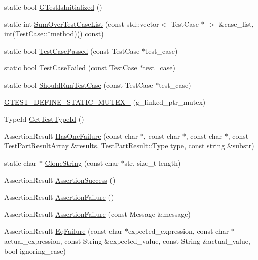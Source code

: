 \begin{DoxyCompactItemize}
\item 
static bool \hyperlink{namespacetesting_1_1internal_a0554a55a03dae7d40e8ba569dac7848f}{\-G\-Test\-Is\-Initialized} ()
\item 
static int \hyperlink{namespacetesting_1_1internal_a9be4a7736e0e7d8754551c6a827c376d}{\-Sum\-Over\-Test\-Case\-List} (const std\-::vector$<$ \-Test\-Case $\ast$ $>$ \&case\-\_\-list, int(\-Test\-Case\-::$\ast$method)() const)
\item 
static bool \hyperlink{namespacetesting_1_1internal_ac961033179851d1a8ff0e009ddeece03}{\-Test\-Case\-Passed} (const \-Test\-Case $\ast$test\-\_\-case)
\item 
static bool \hyperlink{namespacetesting_1_1internal_a9cc56cc516fd6f9e3e1d7ab2183e5b2c}{\-Test\-Case\-Failed} (const \-Test\-Case $\ast$test\-\_\-case)
\item 
static bool \hyperlink{namespacetesting_1_1internal_a122ad0eb3b65d677feb96b46ee9c6848}{\-Should\-Run\-Test\-Case} (const \-Test\-Case $\ast$test\-\_\-case)
\item 
\hyperlink{namespacetesting_1_1internal_a05969f8c5401ec62be3a1f077c592c59}{\-G\-T\-E\-S\-T\-\_\-\-D\-E\-F\-I\-N\-E\-\_\-\-S\-T\-A\-T\-I\-C\-\_\-\-M\-U\-T\-E\-X\-\_\-} (g\-\_\-linked\-\_\-ptr\-\_\-mutex)
\item 
\-Type\-Id \hyperlink{namespacetesting_1_1internal_a3e7f71e983859c908bae4ec8d593ff58}{\-Get\-Test\-Type\-Id} ()
\item 
\-Assertion\-Result \hyperlink{namespacetesting_1_1internal_a7a411c778e3dd9249e6c518dabc21ca4}{\-Has\-One\-Failure} (const char $\ast$, const char $\ast$, const char $\ast$, const \-Test\-Part\-Result\-Array \&results, \-Test\-Part\-Result\-::\-Type type, const string \&substr)
\item 
static char $\ast$ \hyperlink{namespacetesting_1_1internal_a574775e3e17e34fd6bd1cc8b4516a499}{\-Clone\-String} (const char $\ast$str, size\-\_\-t length)
\item 
\-Assertion\-Result \hyperlink{namespacetesting_a6941f23b3ce400dec4d2388cb466271c}{\-Assertion\-Success} ()
\item 
\-Assertion\-Result \hyperlink{namespacetesting_ac0c2a038d9ae21e130904675757fd5f3}{\-Assertion\-Failure} ()
\item 
\-Assertion\-Result \hyperlink{namespacetesting_a94c431f935a5149cafc9872ac0e711a9}{\-Assertion\-Failure} (const \-Message \&message)
\item 
\-Assertion\-Result \hyperlink{namespacetesting_1_1internal_a1b32471fa3a4994b5e41120a349162ca}{\-Eq\-Failure} (const char $\ast$expected\-\_\-expression, const char $\ast$actual\-\_\-expression, const \-String \&expected\-\_\-value, const \-String \&actual\-\_\-value, bool ignoring\-\_\-case)

\end{DoxyCompactItemize}
